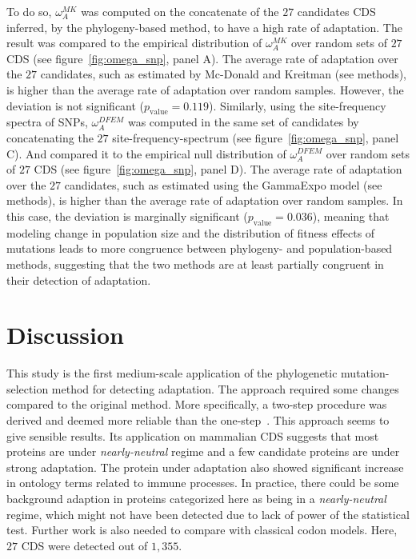 \documentclass{article}
\begin{document}
To do so, $\omega_A^{MK}$ was computed on the concatenate of the $27$ candidates CDS inferred, by the phylogeny-based method, to have a high rate of adaptation.
The result was compared to the empirical distribution of $\omega_A^{MK}$ over random sets of $27$ CDS (see figure~\ref{fig:omega_snp}, panel A).
The average rate of adaptation over the $27$ candidates, such as estimated by Mc-Donald and Kreitman (see methods), is higher than the average rate of adaptation over random samples.
However, the deviation is not significant ($p_{\mathrm{value}}=0.119$).
Similarly, using the site-frequency spectra of SNPs, $\omega_A^{DFEM}$ was computed in the same set of candidates by concatenating the $27$ site-frequency-spectrum (see figure~\ref{fig:omega_snp}, panel C).
And compared it to the empirical null distribution of $\omega_A^{DFEM}$ over random sets of $27$ CDS (see figure~\ref{fig:omega_snp}, panel D).
The average rate of adaptation over the $27$ candidates, such as estimated using the GammaExpo model (see methods), is higher than the average rate of adaptation over random samples.
In this case, the deviation is marginally significant ($p_{\mathrm{value}}=0.036$), 
meaning that modeling change in population size and the distribution of fitness effects of mutations leads to more congruence between phylogeny- and population-based methods, suggesting that the two methods are at least partially congruent in their detection of adaptation.

\section*{Discussion}

This study is the first medium-scale application of the phylogenetic mutation-selection method for detecting adaptation.
The approach required some changes compared to the original method.
More specifically, a two-step procedure was derived and deemed more reliable than the one-step~\citep{Lartillot2013}.
This approach seems to give sensible results.
Its application on mammalian CDS suggests that most proteins are under \textit{nearly-neutral} regime and a few candidate proteins are under strong adaptation.
The protein under adaptation also showed significant increase in ontology terms related to immune processes.
In practice, there could be some background adaption in proteins categorized here as being in a \textit{nearly-neutral} regime, which might not have been detected due to lack of power of the statistical test.
Further work is also needed to compare with classical codon models.
Here, $27$ CDS were detected out of $1,355$.
\end{document}
